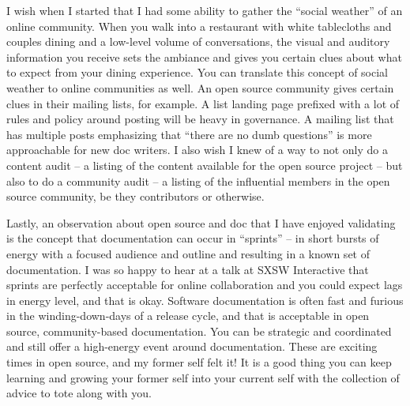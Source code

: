 I wish when I started that I had some ability to gather the ``social weather''
of an online community. When you walk into a restaurant with white tablecloths
and couples dining and a low-level volume of conversations, the visual and
auditory information you receive sets the ambiance and gives you certain clues
about what to expect from your dining experience. You can translate this concept
of social weather to online communities as well. An open source community gives
certain clues in their mailing lists, for example. A list landing page prefixed
with a lot of rules and policy around posting will be heavy in governance. A
mailing list that has multiple posts emphasizing that ``there are no dumb
questions'' is more approachable for new doc writers. I also wish I knew of a
way to not only do a content audit -- a listing of the content available for the
open source project -- but also to do a community audit -- a listing of the
influential members in the open source community, be they contributors or
otherwise.

Lastly, an observation about open source and doc that I have enjoyed validating
is the concept that documentation can occur in ``sprints'' -- in short bursts of
energy with a focused audience and outline and resulting in a known set of
documentation. I was so happy to hear at a talk at SXSW Interactive that sprints
are perfectly acceptable for online collaboration and you could expect lags in
energy level, and that is okay. Software documentation is often fast and furious
in the winding-down-days of a release cycle, and that is acceptable in open
source, community-based documentation. You can be strategic and coordinated and
still offer a high-energy event around documentation. These are exciting times
in open source, and my former self felt it! It is a good thing you can keep
learning and growing your former self into your current self with the collection
of advice to tote along with you.
